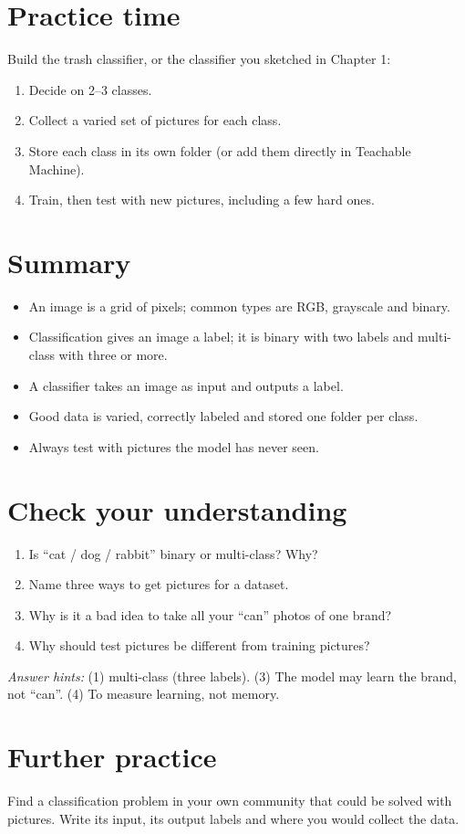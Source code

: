 \section{Practice time}

Build the trash classifier, or the classifier you sketched in Chapter 1:


\begin{enumerate}
\item Decide on 2–3 classes.
\item Collect a varied set of pictures for each class.
\item Store each class in its own folder (or add them directly in Teachable Machine).
\item Train, then test with new pictures, including a few hard ones.
\end{enumerate}

\section*{Summary}

\begin{itemize}
\item An image is a grid of pixels; common types are RGB, grayscale and binary.
\item Classification gives an image a label; it is binary with two labels and multi-class with three or more.
\item A classifier takes an image as input and outputs a label.
\item Good data is varied, correctly labeled and stored one folder per class.
\item Always test with pictures the model has never seen.
\end{itemize}

\section*{Check your understanding}

\begin{enumerate}
\item Is “cat / dog / rabbit” binary or multi-class? Why?
\item Name three ways to get pictures for a dataset.
\item Why is it a bad idea to take all your “can” photos of one brand?
\item Why should test pictures be different from training pictures?
\end{enumerate}

\emph{Answer hints:} (1) multi-class (three labels). (3) The model may learn the brand, not “can”. (4) To measure learning, not memory.


\section*{Further practice}

Find a classification problem in your own community that could be solved with pictures. Write its input, its output labels and where you would collect the data.


\medskip\noindent\hrulefill\medskip
